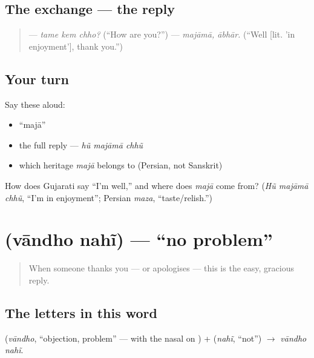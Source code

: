 \subsection*{The exchange — the reply}
\begin{quote}
— \emph{tame kem chho?} (\textquotedblleft{}How are you?\textquotedblright{}) — \emph{majāmā, ābhār.} (\textquotedblleft{}Well {[}lit. 'in enjoyment'{]}, thank you.\textquotedblright{})
\end{quote}

\subsection*{Your turn}
Say these aloud:

\begin{itemize}
\raggedright
  \item \textquotedblleft{}majā\textquotedblright{}
  \item the full reply — \emph{hũ majāmā chhũ}
  \item which heritage \emph{majā} belongs to (Persian, not Sanskrit)
\end{itemize}

\begin{tcolorbox}[breakable,colback=teal!4,colframe=teal!35!black,title={Before you move on}]
How does Gujarati say \textquotedblleft{}I'm well,\textquotedblright{} and where does \emph{majā} come from? (\emph{Hũ majāmā chhũ}, \textquotedblleft{}I'm in enjoyment\textquotedblright{}; Persian \emph{maza}, \textquotedblleft{}taste/relish.\textquotedblright{})
\end{tcolorbox}
\section[\gu{વાંધો} \gu{નહીં}]{  (vāndho nahĩ) — \textquotedblleft{}no problem\textquotedblright{}}

\label{lesson:GU-C03-vandho-nahi}



\begin{quote}
When someone thanks you — or apologises — this is the easy, gracious reply.
\end{quote}

\subsection*{The letters in this word}
\textbf{} (\emph{vāndho}, \textquotedblleft{}objection, problem\textquotedblright{} — with the nasal on \textbf{}) + \textbf{} (\emph{nahĩ}, \textquotedblleft{}not\textquotedblright{}) $\to$ \emph{vāndho nahĩ}.

